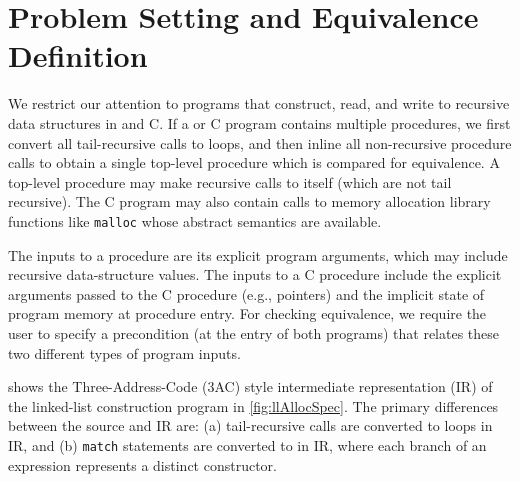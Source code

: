 \section{Problem Setting and Equivalence Definition}
\label{sec:problem-setting}
We restrict
our attention to programs that construct, read, and write to recursive
data structures in \SpecL{} and C.
If a \SpecL{} or C program contains multiple procedures, we first
convert all tail-recursive calls to loops, and then inline
all non-recursive procedure calls to obtain a single top-level procedure which is
compared for equivalence.
A top-level procedure
may make recursive calls to itself (which are not tail recursive).
The C program
may also contain calls to memory allocation library functions
like {\tt malloc} whose
abstract semantics are available.

The inputs to
a \SpecL{} procedure
are its explicit program arguments, which may include
recursive data-structure values.  The inputs to a
C procedure include the explicit arguments passed to the C procedure (e.g., pointers)
and the implicit state of program memory at procedure entry.
For checking equivalence, we require
the user to specify a precondition (at the entry of both
programs) that relates these two different
types of program inputs.

 shows the Three-Address-Code (3AC) style
intermediate representation (IR) of the linked-list construction \SpecL{}
program in \cref{fig:llAllocSpec}. The primary differences between
the \SpecL{} source and IR are: (a) tail-recursive calls
are converted to loops in IR, and (b) {\tt match} statements
are converted to \sumDtor{} in IR,
where each branch of an \sumDtor{}
expression represents a distinct constructor.

